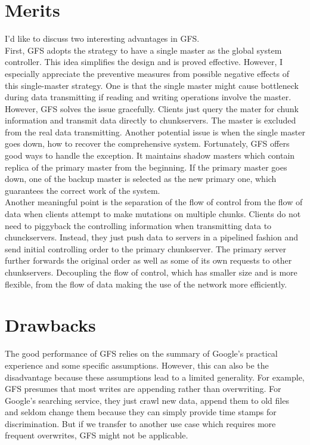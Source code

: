 \documentclass[10pt, letterpaper]{article}
\begin{document}
\section{Merits}
\label{sec-merits}
I'd like to discuss two interesting advantages in GFS.
\\First, GFS adopts the strategy to have a single master as the global system controller. This idea simplifies the design and is proved effective. However, I especially appreciate the preventive measures from possible negative effects of this single-master strategy. One is that the single master might cause bottleneck during data transmitting if reading and writing operations involve the master. However, GFS solves the issue gracefully. Clients just query the mater for chunk information and transmit data directly to chunkservers. The master is excluded from the real data transmitting. Another potential issue is when the single master goes down, how to recover the comprehensive system. Fortunately, GFS offers good ways to handle the exception. It maintains shadow masters which contain replica of the primary master from the beginning. If the primary master goes down, one of the backup master is selected as the new primary one, which guarantees the correct work of the system.~\cite{howGFSworks}
\\Another meaningful point is the separation of the flow of control from the flow of data when clients attempt to make mutations on multiple chunks. Clients do not need to piggyback the controlling information when transmitting data to chunckservers. Instead, they just push data to servers in a pipelined fashion and send initial controlling order to the primary chunkserver. The primary server further forwards the original order as well as some of its own requests to other chunkservers. Decoupling the flow of control, which has smaller size and is more flexible, from the flow of data making the use of the network more efficiently.

\section{Drawbacks}
\label{sec-drawbacks}
The good performance of GFS relies on the summary of Google's practical experience and some specific assumptions. However, this can also be the disadvantage because these assumptions lead to a limited generality. For example, GFS presumes that most writes are appending rather than overwriting. For Google's searching service, they just crawl new data, append them to old files and seldom change them because they can simply provide time stamps for discrimination. But if we transfer to another use case which requires more frequent overwrites, GFS might not be applicable.
\end{document}
